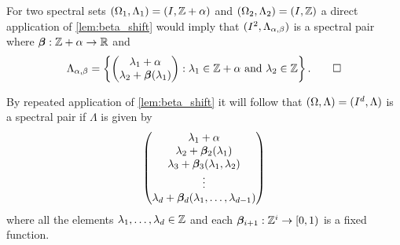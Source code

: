 \documentclass[../thesis.tex]{subfiles}
\begin{document}
\begin{example}
    For two spectral sets $(\Omega_1,\Lambda_1)=(I, \mathbb{Z}+\alpha)$ and $(\Omega_2,\Lambda_2)=(I, \mathbb{Z})$ a direct application of \cref{lem:beta_shift} would imply that $(I^2,\Lambda_{\alpha,\beta})$ is a spectral pair where $\bm{\beta}: \mathbb{Z}+\alpha \rightarrow \mathbb{R}$ and
    \begin{equation*}
        \Lambda_{\alpha,\beta} 
        = \braqMed{\begin{pmatrix}
            \lambda_1 +\alpha\\
            \lambda_2+\betafunc(\lambda_1) %
            \end{pmatrix}
        : \lambda_1 \in \Z +\alpha \text{ and } \lambda_2 \in \Z}. \qedhere
    \end{equation*}
\end{example}


\begin{example}
    By repeated application of \cref{lem:beta_shift} it will follow that $(\Omega,\Lambda)= (I^d, \Lambda)$ is a spectral pair if $\Lambda$ is given by %
    \begin{equation*}
        \begin{pmatrix}
            \lambda_1 +\alpha\\
            \lambda_2+\bm{\beta}_2(\lambda_1)\\
            \lambda_3+\bm{\beta}_3(\lambda_1,\lambda_2)\\
            \vdots\\
            \lambda_d+\bm{\beta}_d(\lambda_1,\dots,\lambda_{d-1})\\
        \end{pmatrix}
    \end{equation*}
    where all the elements $\lambda_1, \dots, \lambda_d \in \mathbb{Z}$ and each $\bm{\beta}_{i+1}:\mathbb{Z}^{i} \rightarrow [0,1)$ is a fixed function.
\end{example}
\end{document}
